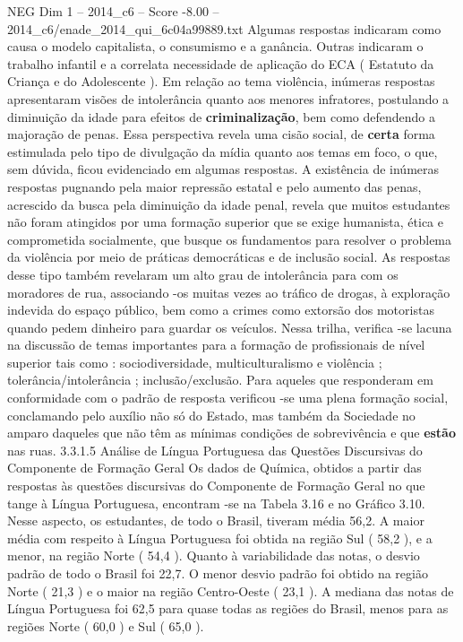 \begin{textsample}{NEG Dim 1 – 2014\_c6 – Score -8.00 – 2014\_c6/enade\_2014\_qui\_6c04a99889.txt}
Algumas respostas indicaram como causa o modelo capitalista, o consumismo e a ganância.
Outras indicaram o trabalho infantil e a correlata necessidade de aplicação do ECA ( Estatuto da Criança e do Adolescente ).
Em relação ao tema violência, inúmeras respostas apresentaram visões de intolerância quanto aos menores infratores, postulando a diminuição da idade para efeitos de \textbf{criminalização}, bem como defendendo a majoração de penas.
Essa perspectiva revela uma cisão social, de \textbf{certa} forma estimulada pelo tipo de divulgação da mídia quanto aos temas em foco, o que, sem dúvida, ficou evidenciado em algumas respostas.
A existência de inúmeras respostas pugnando pela maior repressão estatal e pelo aumento das penas, acrescido da busca pela diminuição da idade penal, revela que muitos estudantes não foram atingidos por uma formação superior que se exige humanista, ética e comprometida socialmente, que busque os fundamentos para resolver o problema da violência por meio de práticas democráticas e de inclusão social.
As respostas desse tipo também revelaram um alto grau de intolerância para com os moradores de rua, associando -os muitas vezes ao tráfico de drogas, à exploração indevida do espaço público, bem como a crimes como extorsão dos motoristas quando pedem dinheiro para guardar os veículos.
Nessa trilha, verifica -se lacuna na discussão de temas importantes para a formação de profissionais de nível superior tais como : sociodiversidade, multiculturalismo e violência ; tolerância/intolerância ; inclusão/exclusão.
Para aqueles que responderam em conformidade com o padrão de resposta verificou -se uma plena formação social, conclamando pelo auxílio não só do Estado, mas também da Sociedade no amparo daqueles que não têm as mínimas condições de sobrevivência e que \textbf{estão} nas ruas. 3.3.1.5 Análise de Língua Portuguesa das Questões Discursivas do Componente de Formação Geral Os dados de Química, obtidos a partir das respostas às questões discursivas do Componente de Formação Geral no que tange à Língua Portuguesa, encontram -se na Tabela 3.16 e no Gráfico 3.10.
Nesse aspecto, os estudantes, de todo o Brasil, tiveram média 56,2.
A maior média com respeito à Língua Portuguesa foi obtida na região Sul ( 58,2 ), e a menor, na região Norte ( 54,4 ).
Quanto à variabilidade das notas, o desvio padrão de todo o Brasil foi 22,7.
O menor desvio padrão foi obtido na região Norte ( 21,3 ) e o maior na região Centro-Oeste ( 23,1 ).
A mediana das notas de Língua Portuguesa foi 62,5 para quase todas as regiões do Brasil, menos para as regiões Norte ( 60,0 ) e Sul ( 65,0 ).

\end{textsample}
